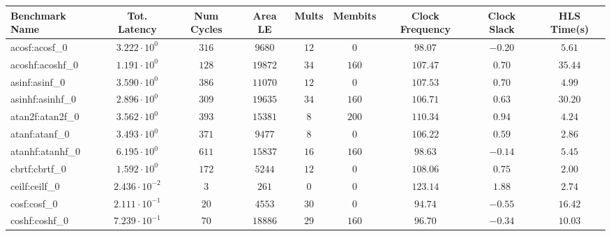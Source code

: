 \begin{tabular}{|l|c|c|c|c|c|c|c|c|}
\hline
Benchmark Name               & Tot. Latency            & Num Cycles & Area LE    & Mults   & Membits  & Clock Frequency & Clock Slack & HLS Time(s) \\
\hline
acosf:acosf\_0               & $ 3.222 \cdot 10^{0}  $ & $ 316    $ & $ 9680   $ & $ 12  $ & $ 0    $ & $ 98.07       $ & $ -0.20   $ & $ 5.61    $ \\
acoshf:acoshf\_0             & $ 1.191 \cdot 10^{0}  $ & $ 128    $ & $ 19872  $ & $ 34  $ & $ 160  $ & $ 107.47      $ & $ 0.70    $ & $ 35.44   $ \\
asinf:asinf\_0               & $ 3.590 \cdot 10^{0}  $ & $ 386    $ & $ 11070  $ & $ 12  $ & $ 0    $ & $ 107.53      $ & $ 0.70    $ & $ 4.99    $ \\
asinhf:asinhf\_0             & $ 2.896 \cdot 10^{0}  $ & $ 309    $ & $ 19635  $ & $ 34  $ & $ 160  $ & $ 106.71      $ & $ 0.63    $ & $ 30.20   $ \\
atan2f:atan2f\_0             & $ 3.562 \cdot 10^{0}  $ & $ 393    $ & $ 15381  $ & $ 8   $ & $ 200  $ & $ 110.34      $ & $ 0.94    $ & $ 4.24    $ \\
atanf:atanf\_0               & $ 3.493 \cdot 10^{0}  $ & $ 371    $ & $ 9477   $ & $ 8   $ & $ 0    $ & $ 106.22      $ & $ 0.59    $ & $ 2.86    $ \\
atanhf:atanhf\_0             & $ 6.195 \cdot 10^{0}  $ & $ 611    $ & $ 15837  $ & $ 16  $ & $ 160  $ & $ 98.63       $ & $ -0.14   $ & $ 5.45    $ \\
cbrtf:cbrtf\_0               & $ 1.592 \cdot 10^{0}  $ & $ 172    $ & $ 5244   $ & $ 12  $ & $ 0    $ & $ 108.06      $ & $ 0.75    $ & $ 2.00    $ \\
ceilf:ceilf\_0               & $ 2.436 \cdot 10^{-2} $ & $ 3      $ & $ 261    $ & $ 0   $ & $ 0    $ & $ 123.14      $ & $ 1.88    $ & $ 2.74    $ \\
cosf:cosf\_0                 & $ 2.111 \cdot 10^{-1} $ & $ 20     $ & $ 4553   $ & $ 30  $ & $ 0    $ & $ 94.74       $ & $ -0.55   $ & $ 16.42   $ \\
coshf:coshf\_0               & $ 7.239 \cdot 10^{-1} $ & $ 70     $ & $ 18886  $ & $ 29  $ & $ 160  $ & $ 96.70       $ & $ -0.34   $ & $ 10.03   $ \\

\end{tabular}
